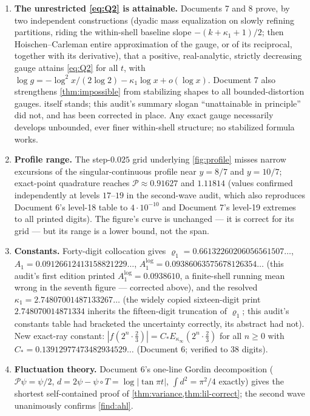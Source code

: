 \documentclass[11pt,oneside]{article}
\theoremstyle{definition}
\theoremstyle{remark}
\begin{document}
\begin{enumerate}
\item \textbf{The unrestricted \eqref{eq:Q2} is attainable.}  Documents
7 and 8 prove, by two independent constructions (dyadic mass
equalization on slowly refining partitions, riding the within-shell
baseline slope $-(k+\kappa_1+1)/2$; then Hoischen--Carleman entire
approximation of the gauge, or of its reciprocal, together with its
derivative), that a positive, real-analytic, strictly decreasing gauge
attains \eqref{eq:Q2} for all $t$, with
$\log g=-\log^2x/(2\log2)-\kappa_1\log x+o(\log x)$.  Document 7 also
strengthens \cref{thm:impossible} from stabilizing shapes to all
bounded-distortion gauges.   itself stands; this
audit's summary slogan ``unattainable in principle'' did not, and has
been corrected in place.  Any exact gauge necessarily develops
unbounded, ever finer within-shell structure; no stabilized formula
works.
\item \textbf{Profile range.}  The step-$0.025$ grid underlying
\cref{fig:profile} misses narrow excursions of the singular-continuous
profile near $y=8/7$ and $y=10/7$; exact-point quadrature reaches
$\mathscr P\approx0.91627$ and $1.11814$ (values confirmed
independently at levels $17$--$19$ in the second-wave audit, which also
reproduces Document 6's level-18 table to $4\cdot10^{-10}$ and Document
7's level-19 extremes to all printed digits).  The figure's curve is
unchanged --- it is correct for its grid --- but its range is a lower
bound, not the span.
\item \textbf{Constants.}  Forty-digit collocation gives
$\varrho_1=0.66132260206056561507\ldots$,
$A_1=0.09126612413158821229\ldots$,
$A_1^{\log}=0.09386063575678126354\ldots$ (this audit's first edition
printed $A_1^{\log}=0.0938610$, a finite-shell running mean wrong in
the seventh figure --- corrected above), and the resolved
$\kappa_1=2.74807001487133267\ldots$ (the widely copied sixteen-digit
print $2.748070014871334$ inherits the fifteen-digit truncation of
$\varrho_1$; this audit's constants table had bracketed the
uncertainty correctly, its abstract had not).  New exact-ray constant:
$|f(2^n\cdot\tfrac23)|=C_*E_{\kappa_\infty}(2^n\cdot\tfrac23)$ for all
$n\ge0$ with $C_*=0.13912977473482934529\ldots$ (Document 6; verified
to $38$ digits).
\item \textbf{Fluctuation theory.}  Document 6's one-line Gordin
decomposition ($\mathcal P\psi=\psi/2$, $d=2\psi-\psi\circ T
=\log|\tan\pi t|$, $\int d^2=\pi^2/4$ exactly) gives the shortest
self-contained proof of \cref{thm:variance,thm:lil-correct}; the
second wave unanimously confirms \cref{find:ahl}.
\end{enumerate}
\appendix
\end{document}
